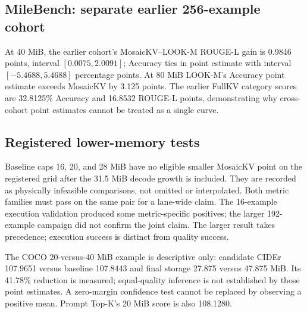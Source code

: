 \subsection{MileBench: separate earlier 256-example cohort}
\begin{table}[t]
\caption{Earlier fixed-budget cohort: 64 examples per subtask, 256 total,
128 per metric family. Its prior use is disclosed. These measurements are
not pooled with E6 or relabeled as the same cohort.}
\centering\small
\end{table}
At 40 MiB, the earlier cohort's MosaicKV--LOOK-M ROUGE-L gain is 0.9846
points, interval $[0.0075,2.0091]$; Accuracy ties in point estimate with
interval $[-5.4688,5.4688]$ percentage points. At 80 MiB LOOK-M's Accuracy
point estimate exceeds MosaicKV by 3.125 points. The earlier FullKV category
scores are 32.8125\% Accuracy and 16.8532 ROUGE-L points, demonstrating
why cross-cohort point estimates cannot be treated as a single curve.

\subsection{Registered lower-memory tests}
\begin{table}[t]
\caption{All feasible E6 lower-memory comparisons. B/M indicates baseline
initial cap / MosaicKV initial cap. Each interval is the paired quality
difference, MosaicKV minus baseline, using 98.75\% per-comparison confidence
for the registered family-wise correction. Quality margin is zero.
Memory passes at initial, final, and peak boundaries; quality does not.}
\centering\scriptsize\resizebox{\textwidth}{!}{}
\end{table}
Baseline caps 16, 20, and 28 MiB have no eligible smaller MosaicKV point on
the registered grid after the 31.5 MiB decode growth is included. They are
recorded as physically infeasible comparisons, not omitted or interpolated.
Both metric families must pass on the same pair for a lane-wide claim.
The 16-example execution validation produced some metric-specific positives;
the larger 192-example campaign did not confirm the joint claim. The larger
result takes precedence; execution success is distinct from quality success.

The COCO 20-versus-40 MiB example is descriptive only: candidate CIDEr
107.9651 versus baseline 107.8443 and final storage 27.875 versus 47.875 MiB.
Its 41.78\% reduction is measured; equal-quality inference is not established
by those point estimates. A zero-margin confidence test cannot be replaced
by observing a positive mean. Prompt Top-K's 20 MiB score is also 108.1280.

